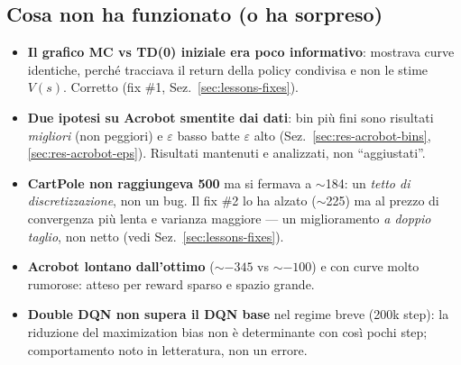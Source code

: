 \subsection{Cosa non ha funzionato (o ha sorpreso)}
\begin{itemize}[nosep]
  \item \textbf{Il grafico MC vs TD(0) iniziale era poco informativo}: mostrava
        curve identiche, perch\'e tracciava il return della policy condivisa e
        non le stime $V(s)$. Corretto (fix \#1, Sez.~\ref{sec:lessons-fixes}).
  \item \textbf{Due ipotesi su Acrobot smentite dai dati}: bin pi\`u fini sono
        risultati \emph{migliori} (non peggiori) e $\varepsilon$ basso batte
        $\varepsilon$ alto (Sez.~\ref{sec:res-acrobot-bins},
        \ref{sec:res-acrobot-eps}). Risultati mantenuti e analizzati, non
        ``aggiustati''.
  \item \textbf{CartPole non raggiungeva 500} ma si fermava a $\sim$184: un
        \emph{tetto di discretizzazione}, non un bug. Il fix \#2 lo ha alzato
        ($\sim$225) ma al prezzo di convergenza pi\`u lenta e varianza maggiore
        --- un miglioramento \emph{a doppio taglio}, non netto (vedi
        Sez.~\ref{sec:lessons-fixes}).
  \item \textbf{Acrobot lontano dall'ottimo} ($\sim$$-345$ vs $\sim$$-100$) e con
        curve molto rumorose: atteso per reward sparso e spazio grande.
  \item \textbf{Double DQN non supera il DQN base} nel regime breve (200k step):
        la riduzione del maximization bias non \`e determinante con cos\`i pochi
        step; comportamento noto in letteratura, non un errore.
\end{itemize}

